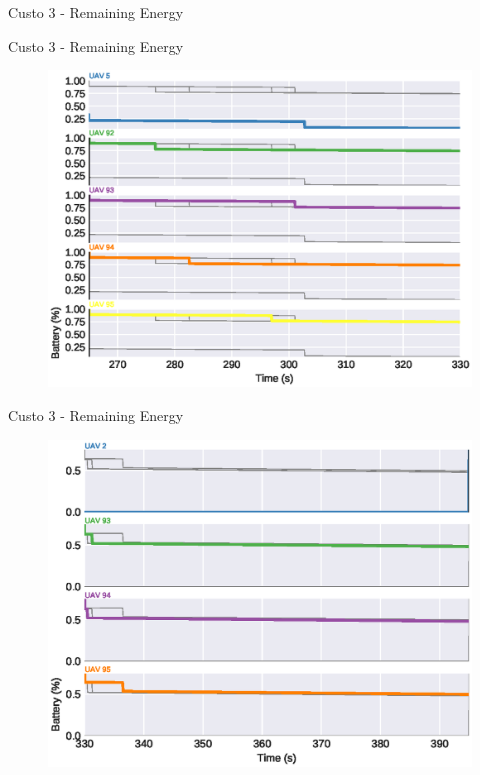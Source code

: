 \begin{frame}{Custo 3 - Remaining Energy}
\begin{figure}[!htb]
                    \end{figure}
                \end{frame}\begin{frame}{Custo 3 - Remaining Energy}
                    \begin{figure}[!htb]
                        \includegraphics[width=\textwidth]{custo_3/uav_remaining_energy_330.eps}
                    \end{figure}
                \end{frame}\begin{frame}{Custo 3 - Remaining Energy}
                    \begin{figure}[!htb]
                        \includegraphics[width=\textwidth]{custo_3/uav_remaining_energy_395.eps}

\end{figure}
\end{frame}
